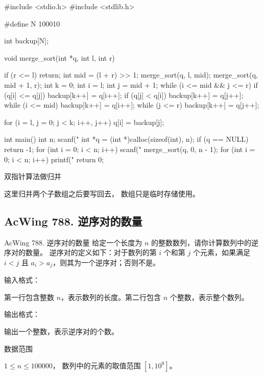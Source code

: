 \begin{mycpptwocol}
    #include <stdio.h>
    #include <stdlib.h>

    #define N 100010

    int backup[N];

    void merge_sort(int *q, int l, int r) {
        if (r <= l) {
            return;
        }
        int mid = (l + r) >> 1;
        merge_sort(q, l, mid);
        merge_sort(q, mid + 1, r);
        int k = 0;
        int i = l;
        int j = mid + 1;
        while (i <= mid && j <= r) {
            if (q[i] <= q[j]) {
                backup[k++] = q[i++];
            }
            if (q[j] < q[i]) {
                backup[k++] = q[j++];
            }
        }
        while (i <= mid) {
            backup[k++] = q[i++];
        }
        while (j <= r) {
            backup[k++] = q[j++];
        }

        for (i = l, j = 0; j < k; i++, j++) {
            q[i] = backup[j];
        }
    }

    int main() {
        int n;
        scanf("%
        int *q = (int *)calloc(sizeof(int), n);
        if (q == NULL) {
            return -1;
        }
        for (int i = 0; i < n; i++) {
            scanf("%
        }
        merge_sort(q, 0, n - 1);
        for (int i = 0; i < n; i++) {
            printf("%
        }
        return 0;
    }
\end{mycpptwocol}

双指针算法做归并

\begin{keypoint}
    这里归并两个子数组之后要写回去，  数组只是临时存储使用。
\end{keypoint}

\subsection{AcWing 788. 逆序对的数量}
\begin{titledbox}{AcWing 788. 逆序对的数量}
    给定一个长度为 $n$ 的整数数列，请你计算数列中的逆序对的数量。
    逆序对的定义如下：对于数列的第 $i$ 个和第 $j$ 个元素，如果满足 $i < j$ 且 $a_i > a_j$，则其为一个逆序对；否则不是。

    输入格式：

    第一行包含整数 $n$，表示数列的长度。第二行包含 $n$ 个整数，表示整个数列。

    输出格式：

    输出一个整数，表示逆序对的个数。

    数据范围

    $1 \le n \le 100000$，
    数列中的元素的取值范围 $[1, 10^9]$。

    \begin{inputblock}
    \end{inputblock}
    \begin{outputblock}
    \end{outputblock}
\end{titledbox}


